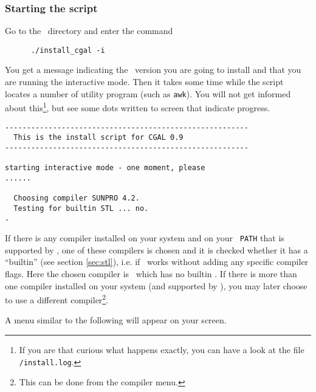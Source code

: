 \subsubsection{Starting the script}

Go to the \cgaldir\ directory and enter the command
\begin{verbatim}
      ./install_cgal -i
\end{verbatim}

You get a message indicating the \cgal\ version you are going to
install and that you are running the interactive mode. Then it takes
some time while the script locates a number of utility program (such
as {\tt awk}). You will not get informed about this\footnote{If you
  are that curious what happens exactly, you can have a look at the
  file {\tt \cgaldir/install.log}.}, but see some dots written to
screen that indicate progress.

\begin{scriptsize}
\begin{verbatim}
--------------------------------------------------------
  This is the install script for CGAL 0.9
--------------------------------------------------------

starting interactive mode - one moment, please
......

  Choosing compiler SUNPRO 4.2.
  Testing for builtin STL ... no.
.
\end{verbatim}
\end{scriptsize}
  
If there is any compiler installed on your system and on your {\tt
  PATH} that is supported by \cgal, one of these compilers is chosen
and it is checked whether it has a ``builtin'' \stl (see section \ref{sec:stl}),
i.e. if \stl\ 
works without adding any specific compiler flags. Here the chosen
compiler is \sunprocc\ which has no builtin \stl. If there is more
than one compiler installed on your system (and supported by \cgal),
you may later choose to use a different compiler\footnote{This can be
  done from the compiler menu.}.

A menu similar to the following will appear on your screen.

